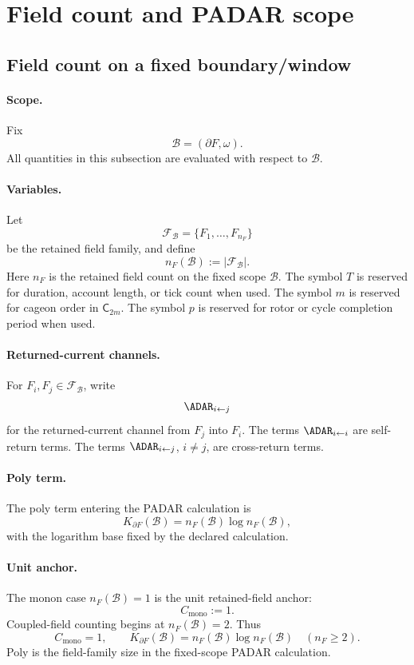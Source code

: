 \section{Field count and PADAR scope}\label{sec:field-count-padar-scope}

\subsection{Field count on a fixed boundary/window}\label{subsec:field-count-fixed-scope}
\paragraph{Scope.}
Fix
\[
\mathcal B=(\partial F,\omega).
\]
All quantities in this subsection are evaluated with respect to \(\mathcal B\).

\paragraph{Variables.}
Let
\[
\mathcal F_{\mathcal B}=\{F_1,\ldots,F_{n_F}\}
\]
be the retained field family, and define
\[
n_F(\mathcal B):=|\mathcal F_{\mathcal B}|.
\]
Here \(n_F\) is the retained field count on the fixed scope \(\mathcal B\). The symbol \(T\) is reserved for duration, account length, or tick count when used. The symbol \(m\) is reserved for cageon order in \(\mathsf C_{2m}\). The symbol \(p\) is reserved for rotor or cycle completion period when used.

\paragraph{Returned-current channels.}
For \(F_i,F_j\in\mathcal F_{\mathcal B}\), write
\[
\ADAR_{i\leftarrow j}
\]
for the returned-current channel from \(F_j\) into \(F_i\). The terms \(\ADAR_{i\leftarrow i}\) are self-return terms. The terms \(\ADAR_{i\leftarrow j}\), \(i\neq j\), are cross-return terms.

\paragraph{Poly term.}
The poly term entering the PADAR calculation is
\[
K_{\partial F}(\mathcal B)=n_F(\mathcal B)\log n_F(\mathcal B),
\]
with the logarithm base fixed by the declared calculation.

\paragraph{Unit anchor.}
The monon case \(n_F(\mathcal B)=1\) is the unit retained-field anchor:
\[
C_{\mathrm{mono}}:=1.
\]
Coupled-field counting begins at \(n_F(\mathcal B)=2\). Thus
\[
C_{\mathrm{mono}}=1,
\qquad
K_{\partial F}(\mathcal B)=n_F(\mathcal B)\log n_F(\mathcal B)
\quad (n_F\ge2).
\]
Poly is the field-family size in the fixed-scope PADAR calculation.

